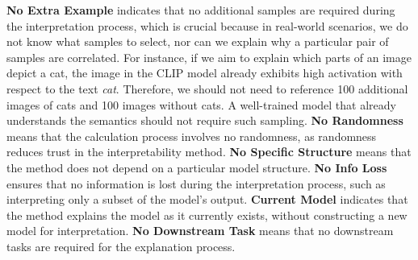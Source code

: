 \textbf{No Extra Example} indicates that no additional samples are required during the interpretation process, which is crucial because in real-world scenarios, we do not know what samples to select, nor can we explain why a particular pair of samples are correlated. For instance, if we aim to explain which parts of an image depict a cat, the image in the CLIP model already exhibits high activation with respect to the text \textit{cat}. Therefore, we should not need to reference 100 additional images of cats and 100 images without cats. A well-trained model that already understands the semantics should not require such sampling. \textbf{No Randomness} means that the calculation process involves no randomness, as randomness reduces trust in the interpretability method. \textbf{No Specific Structure} means that the method does not depend on a particular model structure. \textbf{No Info Loss} ensures that no information is lost during the interpretation process, such as interpreting only a subset of the model's output. \textbf{Current Model} indicates that the method explains the model as it currently exists, without constructing a new model for interpretation. \textbf{No Downstream Task} means that no downstream tasks are required for the explanation process.
